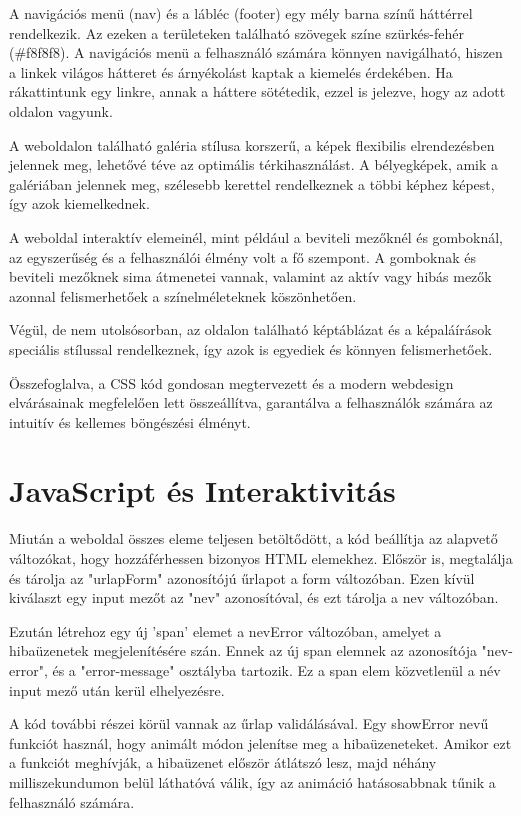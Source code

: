 \documentclass{article}
\begin{document}
A navigációs menü (nav) és a lábléc (footer) egy mély barna színű háttérrel rendelkezik. Az ezeken a területeken található szövegek színe szürkés-fehér (\#f8f8f8). A navigációs menü a felhasználó számára könnyen navigálható, hiszen a linkek világos hátteret és árnyékolást kaptak a kiemelés érdekében. Ha rákattintunk egy linkre, annak a háttere sötétedik, ezzel is jelezve, hogy az adott oldalon vagyunk.

A weboldalon található galéria stílusa korszerű, a képek flexibilis elrendezésben jelennek meg, lehetővé téve az optimális térkihasználást. A bélyegképek, amik a galériában jelennek meg, szélesebb kerettel rendelkeznek a többi képhez képest, így azok kiemelkednek.

A weboldal interaktív elemeinél, mint például a beviteli mezőknél és gomboknál, az egyszerűség és a felhasználói élmény volt a fő szempont. A gomboknak és beviteli mezőknek sima átmenetei vannak, valamint az aktív vagy hibás mezők azonnal felismerhetőek a színelméleteknek köszönhetően.

Végül, de nem utolsósorban, az oldalon található képtáblázat és a képaláírások speciális stílussal rendelkeznek, így azok is egyediek és könnyen felismerhetőek.

Összefoglalva, a CSS kód gondosan megtervezett és a modern webdesign elvárásainak megfelelően lett összeállítva, garantálva a felhasználók számára az intuitív és kellemes böngészési élményt.
\section{JavaScript és Interaktivitás}
\indent\indent Miután a weboldal összes eleme teljesen betöltődött, a kód beállítja az alapvető változókat, hogy hozzáférhessen bizonyos HTML elemekhez. Először is, megtalálja és tárolja az "urlapForm" azonosítójú űrlapot a form változóban. Ezen kívül kiválaszt egy input mezőt az "nev" azonosítóval, és ezt tárolja a nev változóban.

Ezután létrehoz egy új 'span' elemet a nevError változóban, amelyet a hibaüzenetek megjelenítésére szán. Ennek az új span elemnek az azonosítója "nev-error", és a "error-message" osztályba tartozik. Ez a span elem közvetlenül a név input mező után kerül elhelyezésre.

A kód további részei körül vannak az űrlap validálásával. Egy showError nevű funkciót használ, hogy animált módon jelenítse meg a hibaüzeneteket. Amikor ezt a funkciót meghívják, a hibaüzenet először átlátszó lesz, majd néhány milliszekundumon belül láthatóvá válik, így az animáció hatásosabbnak tűnik a felhasználó számára.
\end{document}
